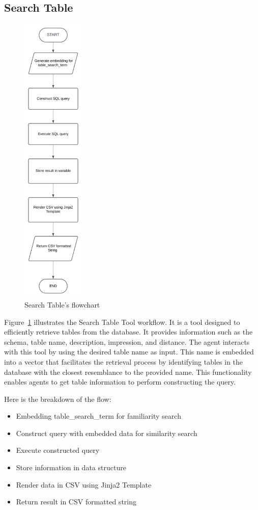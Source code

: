     \subsection{Search Table}
    \begin{figure}[H]
        \centering
        \includegraphics[width=3cm]{chapters/3/figures/search_table.png}
        \caption[Search Table’s flowchart]{Search Table’s flowchart}
        \label{fig:search_table}
    \end{figure}
    Figure~\ref{fig:search_table} illustrates the Search Table Tool workflow. It is a tool designed to efficiently retrieve tables from the database. It provides information such as the schema, table name, description, impression, and distance. The agent interacts with this tool by using the desired table name as input. This name is embedded into a vector that facilitates the retrieval process by identifying tables in the database with the closest resemblance to the provided name. This functionality enables agents to get table information to perform constructing the query.

    Here is the breakdown of the flow:
    \begin{itemize}
        \item  Embedding table\_search\_term for familiarity search
        \item  Construct query with embedded data for similarity search
        \item  Execute constructed query
        \item  Store information in data structure
        \item  Render data in CSV using Jinja2 Template
        \item  Return result in CSV formatted string
    \end{itemize}


